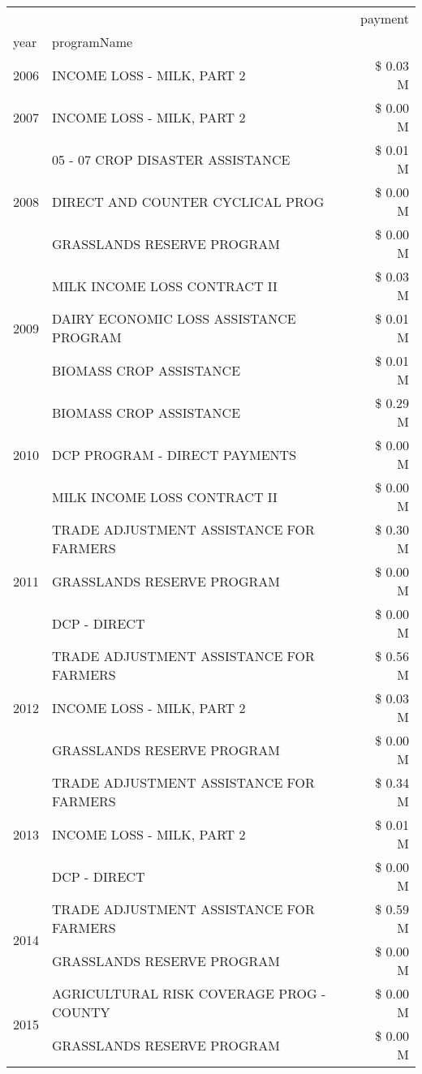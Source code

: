 \begin{tabular}{llr}
\toprule
 &  & payment \\
year & programName &  \\
\midrule
2006 & INCOME LOSS - MILK, PART 2 & \$ 0.03 M \\
\cline{1-3}
2007 & INCOME LOSS - MILK, PART 2 & \$ 0.00 M \\
\cline{1-3}
\multirow[t]{3}{*}{2008} & 05 - 07 CROP DISASTER ASSISTANCE & \$ 0.01 M \\
 & DIRECT AND COUNTER CYCLICAL PROG & \$ 0.00 M \\
 & GRASSLANDS RESERVE PROGRAM & \$ 0.00 M \\
\cline{1-3}
\multirow[t]{3}{*}{2009} & MILK INCOME LOSS CONTRACT II & \$ 0.03 M \\
 & DAIRY ECONOMIC LOSS ASSISTANCE PROGRAM & \$ 0.01 M \\
 & BIOMASS CROP ASSISTANCE & \$ 0.01 M \\
\cline{1-3}
\multirow[t]{3}{*}{2010} & BIOMASS CROP ASSISTANCE & \$ 0.29 M \\
 & DCP PROGRAM - DIRECT PAYMENTS & \$ 0.00 M \\
 & MILK INCOME LOSS CONTRACT II & \$ 0.00 M \\
\cline{1-3}
\multirow[t]{3}{*}{2011} & TRADE ADJUSTMENT ASSISTANCE FOR FARMERS & \$ 0.30 M \\
 & GRASSLANDS RESERVE PROGRAM & \$ 0.00 M \\
 & DCP - DIRECT & \$ 0.00 M \\
\cline{1-3}
\multirow[t]{3}{*}{2012} & TRADE ADJUSTMENT ASSISTANCE FOR FARMERS & \$ 0.56 M \\
 & INCOME LOSS - MILK, PART 2 & \$ 0.03 M \\
 & GRASSLANDS RESERVE PROGRAM & \$ 0.00 M \\
\cline{1-3}
\multirow[t]{3}{*}{2013} & TRADE ADJUSTMENT ASSISTANCE FOR FARMERS & \$ 0.34 M \\
 & INCOME LOSS - MILK, PART 2 & \$ 0.01 M \\
 & DCP - DIRECT & \$ 0.00 M \\
\cline{1-3}
\multirow[t]{2}{*}{2014} & TRADE ADJUSTMENT ASSISTANCE FOR FARMERS & \$ 0.59 M \\
 & GRASSLANDS RESERVE PROGRAM & \$ 0.00 M \\
\cline{1-3}
\multirow[t]{2}{*}{2015} & AGRICULTURAL RISK COVERAGE PROG - COUNTY & \$ 0.00 M \\
 & GRASSLANDS RESERVE PROGRAM & \$ 0.00 M \\

\end{tabular}

